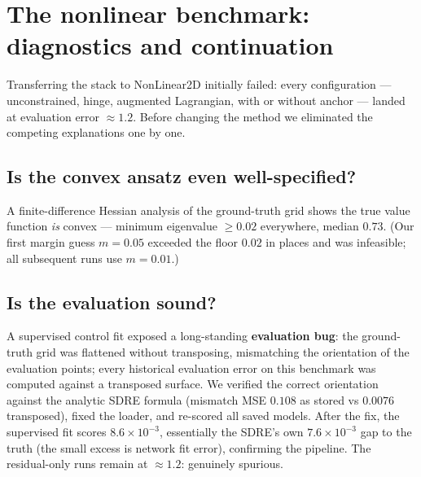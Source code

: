 \documentclass[11pt,a4paper]{article}
\begin{document}
\section{The nonlinear benchmark: diagnostics and continuation}
\label{sec:continuation}

Transferring the stack to NonLinear2D initially failed: every configuration
--- unconstrained, hinge, augmented Lagrangian, with or without anchor ---
landed at evaluation error $\approx 1.2$. Before changing the method we
eliminated the competing explanations one by one.

\subsection{Is the convex ansatz even well-specified?}\label{sec:nl-convex}
A finite-difference Hessian analysis of the ground-truth grid shows the true
value function \emph{is} convex --- minimum eigenvalue $\ge 0.02$
everywhere, median $0.73$. (Our first margin guess $m=0.05$ exceeded the
floor $0.02$ in places and was infeasible; all subsequent runs use
$m = 0.01$.)

\subsection{Is the evaluation sound?}
A supervised control fit exposed a long-standing \textbf{evaluation bug}:
the ground-truth grid was flattened without transposing, mismatching the
orientation of the evaluation points; every historical evaluation error on
this benchmark was computed against a transposed surface. We verified the
correct orientation against the analytic SDRE formula (mismatch MSE $0.108$
as stored vs $0.0076$ transposed), fixed the loader, and re-scored all
saved models. After the fix, the supervised fit scores $8.6\times10^{-3}$,
essentially the SDRE's own $7.6\times10^{-3}$ gap to the truth (the small
excess is network fit error), confirming the pipeline. The
residual-only runs remain at $\approx 1.2$: genuinely spurious.
\end{document}
